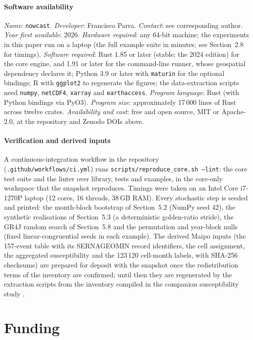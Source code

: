 \documentclass[authoryear,preprint,review,12pt]{elsarticle}
\begin{document}
\paragraph{Software availability}
\emph{Name}: \texttt{nowcast}.
\emph{Developer}: Francisco Parra.
\emph{Contact}: see corresponding author.
\emph{Year first available}: 2026.
\emph{Hardware required}: any 64-bit machine; the experiments in this paper run on
a laptop (the full example suite in minutes; see Section~2.8 for timings).
\emph{Software required}: Rust 1.85 or later (stable; the 2024 edition) for the core engine, and 1.91
or later for the command-line runner, whose geospatial dependency declares it;
Python 3.9 or later with \texttt{maturin} for the optional bindings; R with
\texttt{ggplot2} to regenerate the figures; the data-extraction scripts need
\texttt{numpy}, \texttt{netCDF4}, \texttt{xarray} and \texttt{earthaccess}.
\emph{Program language}: Rust (with Python bindings via PyO3).
\emph{Program size}: approximately 17\,000 lines of Rust across twelve crates.
\emph{Availability and cost}: free and open source, MIT or Apache-2.0, at the
repository and Zenodo DOIs above.

\paragraph{Verification and derived inputs}
A continuous-integration workflow in the repository
(\texttt{.github/workflows/ci.yml}) runs \texttt{scripts/reproduce\_core.sh --lint}: the
core test suite and the linter over library, tests and examples, in the core-only
workspace that the snapshot reproduces. Timings were taken on an Intel Core i7-1270P
laptop (12 cores, 16 threads, 38\,GB RAM). Every stochastic step is seeded and printed:
the month-block bootstrap of Section~5.2 (NumPy seed 42), the synthetic realisations
of Section~5.3 (a deterministic golden-ratio stride), the GR4J random search of
Section~5.8 and the permutation and year-block nulls (fixed linear-congruential
seeds in each example). The derived Maipo inputs (the 157-event table with its
SERNAGEOMIN record identifiers, the cell assignment, the aggregated susceptibility and
the 123\,120 cell-month labels, with SHA-256 checksums) are prepared for deposit with
the snapshot once the redistribution terms of the inventory are confirmed; until then
they are regenerated by the extraction scripts from the inventory compiled in the
companion susceptibility study \citep{parra2026transfer}.

\section*{Funding}
\end{document}
